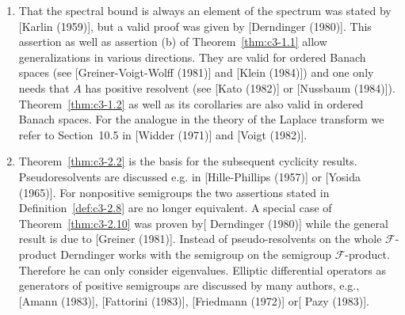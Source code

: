 \begin{enumerate}[label=\emph{Section \arabic*:}, wide]
\item
That the spectral bound is always an element of the spectrum was stated by [Karlin (1959)], but a valid proof was given by [Derndinger (1980)]. 
This assertion as well as assertion (b) of Theorem~\ref{thm:c3-1.1} allow generalizations in various directions.  
They are valid for ordered Banach spaces (see [Greiner-Voigt-Wolff (1981)] and [Klein (1984)]) and one only needs that $A$ has positive resolvent (see [Kato (1982)] or [Nussbaum (1984)]). 
Theorem~\ref{thm:c3-1.2} as well as its corollaries are also valid in ordered Banach spaces. 
For the analogue in the theory of the Laplace transform we refer to Section~10.5 in [Widder (1971)] and [Voigt (1982)].

\item 
Theorem~\ref{thm:c3-2.2} is the basis for the subsequent cyclicity results. 
Pseudoresolvents are discussed e.g. in [Hille-Phillips (1957)] or [Yosida (1965)]. 
For nonpositive semigroups the two assertions stated in Definition~\ref{def:c3-2.8} are no longer equivalent. 
A special case of Theorem~\ref{thm:c3-2.10} was proven by[ Derndinger (1980)] while the general result is due to [Greiner (1981)]. Instead of pseudo-resolvents on the whole $\mathcal{F}$-product Derndinger works with the semigroup on the semigroup $\mathcal{F}$-product. 
Therefore he can only consider eigenvalues. 
Elliptic differential operators as generators of positive semigroups are discussed by many authors, e.g., [Amann (1983)], [Fattorini (1983)], [Friedmann (1972)] or[ Pazy (1983)].


\end{enumerate}
